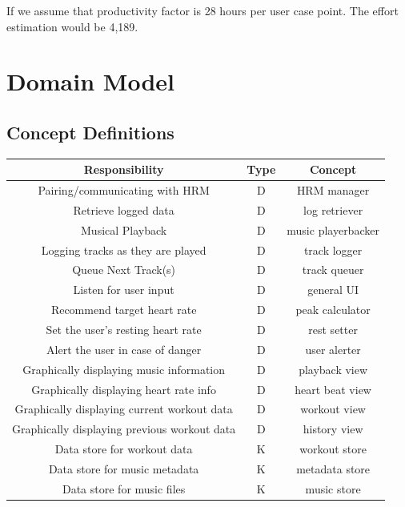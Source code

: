 \documentclass[letterpaper,english, 12pt]{scrreprt}
\begin{document}
If we assume that productivity factor is 28 hours per user case point. The effort estimation would be 4,189.

\chapter{Domain Model}
    \section{Concept Definitions}
		\begin{center}
		\renewcommand{\arraystretch}{1.5}
	        \begin{tabular}[h]{|c|c|c|}
	           \hline
	           Responsibility & Type & Concept\\
	           \hline
	           Pairing/communicating with HRM & D & HRM manager\\
	           \hline
	           Retrieve logged data & D & log retriever\\
	           \hline
	           Musical Playback & D & music playerbacker\\
	           \hline
	           Logging tracks as they are played & D & track logger\\
	           \hline
	           Queue Next Track(s) & D & track queuer\\
	           \hline
	           Listen for user input & D & general UI\\
	           \hline
		   Recommend target heart rate & D & peak calculator\\
		   \hline
		   Set the user's resting heart rate & D & rest setter\\
		   \hline
		   Alert the user in case of danger & D & user alerter\\
		   \hline
	           Graphically displaying music information & D & playback view\\
	           \hline
	           Graphically displaying heart rate info & D & heart beat view\\
	           \hline
	           Graphically displaying current workout data & D & workout view\\
	           \hline
	           Graphically displaying previous workout data & D & history view\\
	           \hline
	           Data store for workout data & K & workout store\\
	           \hline
	           Data store for music metadata & K & metadata store\\
	           \hline
	           Data store for music files & K & music store\\
	           \hline
	       \end{tabular}
		\end{center}
	   
\end{document}
